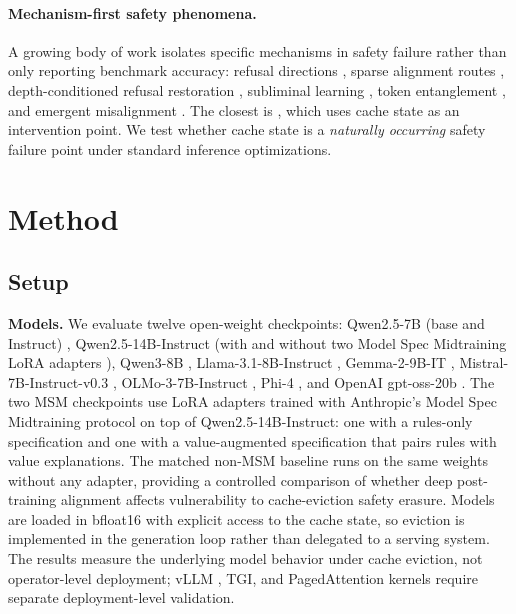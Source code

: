 \documentclass{article}
\begin{document}
\paragraph{Mechanism-first safety phenomena.}
A growing body of work isolates specific mechanisms in safety failure rather than only reporting benchmark accuracy: refusal directions \citep{arditi2024refusal,joad2026more_refusal}, sparse alignment routes \citep{frank2026alignmentroutes}, depth-conditioned refusal restoration \citep{zhang2026anydepth}, subliminal learning \citep{cloud2025subliminal}, token entanglement \citep{zur2025token}, and emergent misalignment \citep{betley2025emergent}. The closest is \citet{wang2025cacheprune}, which uses cache state as an intervention point. We test whether cache state is a \emph{naturally occurring} safety failure point under standard inference optimizations.

\section{Method}

\subsection{Setup}

\textbf{Models.} We evaluate twelve open-weight checkpoints: Qwen2.5-7B (base and Instruct) \citep{qwen2024qwen25}, Qwen2.5-14B-Instruct (with and without two Model Spec Midtraining LoRA adapters \citep{li2025msm}), Qwen3-8B \citep{yang2025qwen3}, Llama-3.1-8B-Instruct \citep{grattafiori2024llama3}, Gemma-2-9B-IT \citep{team2024gemma}, Mistral-7B-Instruct-v0.3 \citep{jiang2023mistral}, OLMo-3-7B-Instruct \citep{olmo2025olmo2}, Phi-4 \citep{abdin2024phi4}, and OpenAI gpt-oss-20b \citep{openai2025gptoss}. The two MSM checkpoints use LoRA adapters trained with Anthropic's Model Spec Midtraining protocol on top of Qwen2.5-14B-Instruct: one with a rules-only specification and one with a value-augmented specification that pairs rules with value explanations. The matched non-MSM baseline runs on the same weights without any adapter, providing a controlled comparison of whether deep post-training alignment affects vulnerability to cache-eviction safety erasure. Models are loaded in bfloat16 with explicit access to the cache state, so eviction is implemented in the generation loop rather than delegated to a serving system. The results measure the underlying model behavior under cache eviction, not operator-level deployment; vLLM \citep{kwon2023pagedattention}, TGI, and PagedAttention kernels require separate deployment-level validation.
\end{document}
